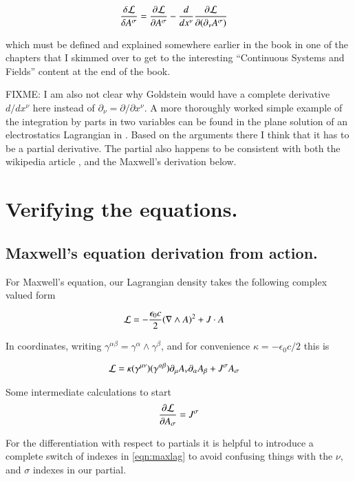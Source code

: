 \documentclass{article}
\begin{document}
\begin{align*}
\frac{\delta \mathcal{L}}{\delta A^\sigma} &= \frac{\partial {\mathcal{L}}}{\partial {A^\sigma}} - \frac{d}{dx^\nu} \frac{\partial {\mathcal{L}}}{\partial {(\partial_\nu A^\sigma)}}
\end{align*}

which must be defined and explained somewhere earlier in the book in one of the chapters that I skimmed over to get to the interesting ``Continuous Systems and Fields'' content
at the end of the book.

FIXME: I am also not clear why Goldstein would have a complete derivative $d/dx^\nu$ here instead of $\partial_\nu = \partial/{\partial x^\nu}$.  A more thoroughly worked simple example
of the integration by parts in two variables can be found in the plane solution of an electrostatics Lagrangian in \cite{PJMaxwellLagrangian}.  Based on the arguments there I think that it has to be a partial derivative.   The partial also happens to be consistent with both the wikipedia article \cite{wikiemtensor}, and the Maxwell's derivation below.

\section{ Verifying the equations. }
\subsection{ Maxwell's equation derivation from action. }

For Maxwell's equation, our Lagrangian density takes the following complex valued form

\begin{align}\label{eqn:maxlag}
\mathcal{L} &= -\frac{\epsilon_0 c}{2} (\nabla \wedge A)^2 + J \cdot A
\end{align}

In coordinates, writing $\gamma^{\alpha\beta} = \gamma^\alpha \wedge \gamma^\beta$, and 
for convenience $\kappa = -\epsilon_0 c /2$ this is

\begin{align}\label{eqn:maxlagcomp}
\mathcal{L} &= \kappa (\gamma^{\mu\nu}) (\gamma^{\alpha\beta}) \partial_\mu A_\nu \partial_\alpha A_\beta + J^\sigma A_\sigma
\end{align}

Some intermediate calculations to start
\begin{align*}
\frac{\partial {\mathcal{L}}}{\partial {A_\sigma}} = J^\sigma
\end{align*}

For the differentiation with respect to partials it is helpful to introduce a complete switch of indexes in \ref{eqn:maxlag}
to avoid confusing things with the $\nu$, and $\sigma$ indexes in our partial.
\end{document}
